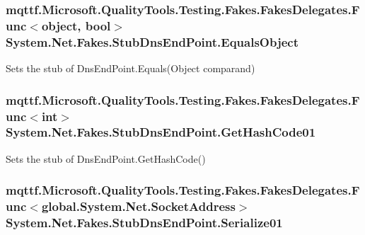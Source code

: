 \hypertarget{class_system_1_1_net_1_1_fakes_1_1_stub_dns_end_point_a62f0da54998d4aacf0e66b926a9429af}{
\subsubsection[{Equals\-Object}]{\setlength{\rightskip}{0pt plus 5cm}mqttf.\-Microsoft.\-Quality\-Tools.\-Testing.\-Fakes.\-Fakes\-Delegates.\-Func$<$object, bool$>$ System.\-Net.\-Fakes.\-Stub\-Dns\-End\-Point.\-Equals\-Object}}\label{class_system_1_1_net_1_1_fakes_1_1_stub_dns_end_point_a62f0da54998d4aacf0e66b926a9429af}


Sets the stub of Dns\-End\-Point.\-Equals(\-Object comparand)

\hypertarget{class_system_1_1_net_1_1_fakes_1_1_stub_dns_end_point_ad56c8873d2b4ebbe19ae059f1470e893}{
\subsubsection[{Get\-Hash\-Code01}]{\setlength{\rightskip}{0pt plus 5cm}mqttf.\-Microsoft.\-Quality\-Tools.\-Testing.\-Fakes.\-Fakes\-Delegates.\-Func$<$int$>$ System.\-Net.\-Fakes.\-Stub\-Dns\-End\-Point.\-Get\-Hash\-Code01}}\label{class_system_1_1_net_1_1_fakes_1_1_stub_dns_end_point_ad56c8873d2b4ebbe19ae059f1470e893}


Sets the stub of Dns\-End\-Point.\-Get\-Hash\-Code()

\hypertarget{class_system_1_1_net_1_1_fakes_1_1_stub_dns_end_point_aecbe8f8e08ebd5e2f85884730ad47195}{
\subsubsection[{Serialize01}]{\setlength{\rightskip}{0pt plus 5cm}mqttf.\-Microsoft.\-Quality\-Tools.\-Testing.\-Fakes.\-Fakes\-Delegates.\-Func$<$global.\-System.\-Net.\-Socket\-Address$>$ System.\-Net.\-Fakes.\-Stub\-Dns\-End\-Point.\-Serialize01}}\label{class_system_1_1_net_1_1_fakes_1_1_stub_dns_end_point_aecbe8f8e08ebd5e2f85884730ad47195}


